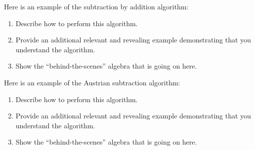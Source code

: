 \documentclass[nooutcomes]{ximera}
\begin{document}
\begin{problem}Here is an example of the subtraction by addition
  algorithm:
\begin{image}
\end{image}
\begin{enumerate}
\item Describe how to perform this algorithm.
\item Provide an additional relevant and revealing example
  demonstrating that you understand the algorithm.
\item Show the ``behind-the-scenes'' algebra that is going on here.
\end{enumerate}
\end{problem} 

\begin{problem}Here is an example of the Austrian subtraction
  algorithm:
\begin{image}
\end{image}
\begin{enumerate}
\item Describe how to perform this algorithm.
\item Provide an additional relevant and revealing example
  demonstrating that you understand the algorithm.
\item Show the ``behind-the-scenes'' algebra that is going on here.
\end{enumerate}
\end{problem} 
\end{document}
